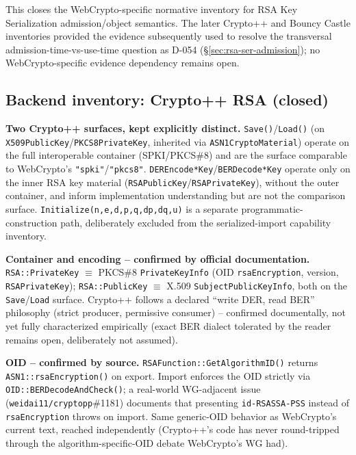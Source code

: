 \documentclass[11pt,a4paper]{article}
\begin{document}
This closes the WebCrypto-specific normative inventory for RSA Key Serialization admission/object semantics. The later Crypto++ and Bouncy Castle inventories provided the evidence subsequently used to resolve the transversal admission-time-vs-use-time question as D-054 (\S\ref{sec:rsa-ser-admission}); no WebCrypto-specific evidence dependency remains open.

\subsection{Backend inventory: Crypto++ RSA (closed)}\label{sec:rsa-ser-cryptopp}

\textbf{Two Crypto++ surfaces, kept explicitly distinct.} \texttt{Save()}/\texttt{Load()} (on \texttt{X509PublicKey}/\texttt{PKCS8PrivateKey}, inherited via \texttt{ASN1CryptoMaterial}) operate on the full interoperable container (SPKI/PKCS\#8) and are the surface comparable to WebCrypto's \texttt{"spki"}/\texttt{"pkcs8"}. \texttt{DEREncode*Key}/\texttt{BERDecode*Key} operate only on the inner RSA key material (\texttt{RSAPublicKey}/\texttt{RSAPrivateKey}), without the outer container, and inform implementation understanding but are not the comparison surface. \texttt{Initialize(n,e,d,p,q,dp,dq,u)} is a separate programmatic-construction path, deliberately excluded from the serialized-import capability inventory.

\textbf{Container and encoding -- confirmed by official documentation.} \texttt{RSA::PrivateKey} $\equiv$ PKCS\#8 \texttt{PrivateKeyInfo} (OID \texttt{rsaEncryption}, version, \texttt{RSAPrivateKey}); \texttt{RSA::PublicKey} $\equiv$ X.509 \texttt{SubjectPublicKeyInfo}, both on the \texttt{Save}/\texttt{Load} surface. Crypto++ follows a declared ``write DER, read BER'' philosophy (strict producer, permissive consumer) -- confirmed documentally, not yet fully characterized empirically (exact BER dialect tolerated by the reader remains open, deliberately not assumed).

\textbf{OID -- confirmed by source.} \texttt{RSAFunction::GetAlgorithmID()} returns \texttt{ASN1::rsaEncryption()} on export. Import enforces the OID strictly via \texttt{OID::BERDecodeAndCheck()}; a real-world WG-adjacent issue (\texttt{weidai11/cryptopp}\#1181) documents that presenting \texttt{id-RSASSA-PSS} instead of \texttt{rsaEncryption} throws on import. Same generic-OID behavior as WebCrypto's current text, reached independently (Crypto++'s code has never round-tripped through the algorithm-specific-OID debate WebCrypto's WG had).
\end{document}
